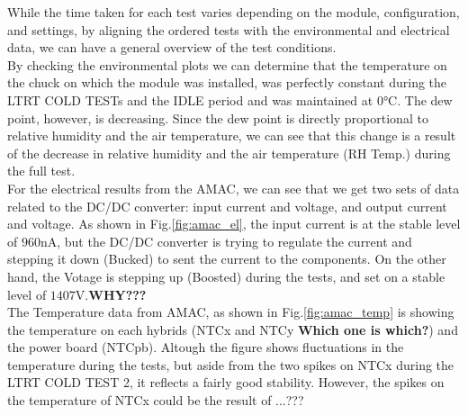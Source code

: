 While the time taken for each test varies depending on the module, configuration, and settings, by aligning the ordered tests with the environmental and electrical data, we can have a general overview of the test conditions. \\
By checking the environmental plots we can determine that the temperature on the chuck on which the module was installed, was perfectly constant during the LTRT COLD TESTs and the IDLE period and was maintained at $0\si{\celsius}$. The dew point, however, is decreasing. Since the dew point is directly proportional to relative humidity and the air temperature, we can see that this change is a result of the decrease in relative humidity and the air temperature (RH Temp.) during the full test.\\

For the electrical results from the AMAC, we can see that we get two sets of data related to the DC/DC converter: input current and voltage, and output current and voltage. As shown in Fig.\ref{fig:amac_el}, the input current is at the stable level of $960\si{\nano\ampere}$, but the DC/DC converter is trying to regulate the current and stepping it down (Bucked) to sent the current to the components. On the other hand, the Votage is stepping up (Boosted) during the tests, and set on a stable level of $1407 \si{\volt}$.\textbf{WHY???}\\

The Temperature data from AMAC, as shown in Fig.\ref{fig:amac_temp} is showing the temperature on each hybrids (NTCx and NTCy \textbf{Which one is which?}) and the power board (NTCpb). Altough the figure shows fluctuations in the temperature during the tests, but aside from the two spikes on NTCx during the LTRT COLD TEST 2, it reflects a fairly good stability. However, the spikes on the temperature of NTCx could be the result of ...???

